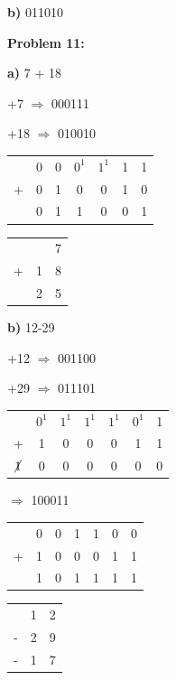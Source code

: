 \documentclass{article}
\begin{document}
    \quad\quad {}

    \quad \textbf{b)} 011010

    \quad\quad {}

    \textbf{Problem 11:}

    \quad \textbf{a)} 7 + 18

    \quad\quad +7 $\Rightarrow$ 000111

    \quad\quad +18 $\Rightarrow$ 010010

    \begin{center}
        \begin{tabular}{ ccccccc }
              & 0 & 0 & $0^1$ & $1^1$ & 1 & 1 \\
            + & 0 & 1 & 0 & 0 & 1 & 0  \\
            \hline
            & 0 & 1 & 1 & 0 & 0 & 1
        \end{tabular}
        \quad\quad 
        \begin{tabular}{ ccc }
            & & 7 \\
            + & 1 & 8 \\
            \hline
            & 2 & 5
        \end{tabular}
    \end{center}

    \quad \textbf{b)} 12-29

    \quad\quad +12 $\Rightarrow$ 001100

    \quad\quad +29 $\Rightarrow$ 011101

    \begin{center}
        \begin{tabular}{ ccccccc }
              & $0^1$ & $1^1$ & $1^1$ & $1^1$ & $0^1$ & 1 \\
            + & 1 & 0 & 0 & 0 & 1 & 1  \\
            \hline
            $\cancel{1}$ & 0 & 0 & 0 & 0 & 0 & 0 
        \end{tabular}
    \end{center}

    \quad{} $\Rightarrow$ 100011

    \begin{center}
        \begin{tabular}{ ccccccc }
              & 0 & 0 & 1 & 1 & 0 & 0 \\
            + & 1 & 0 & 0 & 0 & 1 & 1  \\
            \hline
            & 1 & 0 & 1 & 1 & 1 & 1
        \end{tabular}
        \quad\quad 
        \begin{tabular}{ ccc }
            & 1 & 2 \\
            - & 2 & 9 \\
            \hline
            -& 1 & 7
        \end{tabular}
    \end{center}
\end{document}
